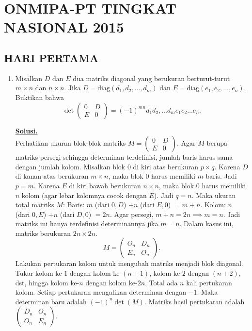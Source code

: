 \documentclass[12pt,twoside]{article}
\newenvironment{solution}
{
	\par\noindent\textbf{\underline{Solusi.}}\\
}
{
	\par
}
\begin{document}
\section{ONMIPA-PT TINGKAT NASIONAL 2015}
\subsection{HARI PERTAMA}
\begin{enumerate}
  \item Misalkan $D$ dan $E$ dua matriks diagonal yang berukuran berturut-turut $m\times n$ dan $n\times n$. Jika $D=\text{diag}(d_1,d_2,\dots,d_m)$ dan $E=\text{diag}(e_1,e_2,\dots,e_n)$. Buktikan bahwa $$\det\begin{pmatrix}
            0 & D \\ E & 0
          \end{pmatrix}=(-1)^{mn}d_1d_2,\dots d_me_1e_2\dots e_n.$$
        \begin{solution}
          Perhatikan ukuran blok-blok matriks $M = \begin{pmatrix} 0 & D \\ E & 0 \end{pmatrix}$.
          Agar $M$ berupa matriks persegi sehingga determinan terdefinisi, jumlah baris harus sama dengan jumlah kolom.
          Misalkan blok $0$ di kiri atas berukuran $p \times q$.
          Karena $D$ di kanan atas berukuran $m \times n$, maka blok $0$ harus memiliki $m$ baris. Jadi $p=m$.
          Karena $E$ di kiri bawah berukuran $n \times n$, maka blok $0$ harus memiliki $n$ kolom (agar lebar kolomnya cocok dengan $E$). Jadi $q=n$.
          Maka ukuran total matriks $M$:
          Baris: $m$ (dari $0, D$) $+ n$ (dari $E, 0$) $= m+n$.
          Kolom: $n$ (dari $0, E$) $+ n$ (dari $D, 0$) $= 2n$.
          Agar persegi, $m+n = 2n \implies m=n$.
          Jadi matriks ini hanya terdefinisi determinannya jika $m=n$.
          Dalam kasus ini, matriks berukuran $2n \times 2n$.
          $$ M = \begin{pmatrix} O_n & D_n \\ E_n & O_n \end{pmatrix}. $$
          Lakukan pertukaran kolom untuk mengubah matriks menjadi blok diagonal.
          Tukar kolom ke-$1$ dengan kolom ke-$(n+1)$, kolom ke-$2$ dengan $(n+2)$, dst, hingga kolom ke-$n$ dengan kolom ke-$2n$.
          Total ada $n$ kali pertukaran kolom. Setiap pertukaran mengalikan determinan dengan $-1$.
          Maka determinan baru adalah $(-1)^n \det(M)$.
          Matriks hasil pertukaran adalah $\begin{pmatrix} D_n & O_n \\ O_n & E_n \end{pmatrix}$.

\end{solution}
\end{enumerate}
\end{document}
